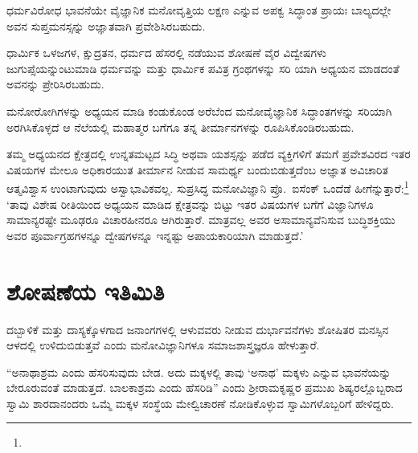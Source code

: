 \vskip 1.4pt

ಧರ್ಮವಿರೋಧ ಭಾವನೆಯೇ ವೈಜ್ಞಾನಿಕ ಮನೋವೃತ್ತಿಯ ಲಕ್ಷಣ ಎನ್ನುವ ಅಪಕ್ವ ಸಿದ್ಧಾಂತ ಪ್ರಾಯಃ ಬಾಲ್ಯದಲ್ಲೇ ಅವನ ಸುಪ್ತಮನಸ್ಸನ್ನು ಅಜ್ಞಾತವಾಗಿ ಪ್ರವೇಶಿಸಿರಬಹುದು.

\vskip 1.4pt

ಧಾರ್ಮಿಕ ಒಳಜಗಳ, ಕ್ಷುದ್ರತನ, ಧರ್ಮದ ಹೆಸರಲ್ಲಿ ನಡೆಯುವ ಶೋಷಣೆ ವೈರ ವಿದ್ವೇಷಗಳು ಜುಗುಪ್ಸೆಯನ್ನುಂಟುಮಾಡಿ ಧರ್ಮವನ್ನು ಮತ್ತು ಧಾರ್ಮಿಕ ಪವಿತ್ರ ಗ್ರಂಥಗಳನ್ನು ಸರಿ ಯಾಗಿ ಅಧ್ಯಯನ ಮಾಡದಂತೆ ಅವನನ್ನು ಪ್ರೇರಿಸಿರಬಹುದು.

\vskip 1.4pt

ಮನೋರೋಗಿಗಳನ್ನು ಅಧ್ಯಯನ ಮಾಡಿ ಕಂಡುಕೊಂಡ ಅರೆಬೆಂದ ಮನೋವೈಜ್ಞಾನಿಕ ಸಿದ್ಧಾಂತಗಳನ್ನು ಸರಿಯಾಗಿ ಅರಗಿಸಿಕೊಳ್ಳದೆ ಆ ನೆಲೆಯಲ್ಲಿ ಮಹಾತ್ಮರ ಬಗೆಗೂ ತನ್ನ ತೀರ್ಮಾನಗಳನ್ನು ರೂಪಿಸಿಕೊಂಡಿರಬಹುದು.

\vskip 1.4pt

ತಮ್ಮ ಅಧ್ಯಯನದ ಕ್ಷೇತ್ರದಲ್ಲಿ ಉನ್ನತಮಟ್ಟದ ಸಿದ್ಧಿ ಅಥವಾ ಯಶಸ್ಸನ್ನು ಪಡೆದ ವ್ಯಕ್ತಿಗಳಿಗೆ ತಮಗೆ ಪ್ರವೇಶವಿರದ ಇತರ ವಿಷಯಗಳ ಮೇಲೂ ಅಧಿಕಾರಯುತ ತೀರ್ಮಾನ ನೀಡುವ ಸಾಮರ್ಥ್ಯ ಬಂದುಬಿಡುತ್ತದೆಂಬ ಅಜ್ಞಾತ ಅವಿಚಾರಿತ ಆತ್ಮವಿಶ್ವಾಸ ಉಂಟಾಗುವುದು ಅಸ್ವಾಭಾವಿಕವಲ್ಲ. ಸುಪ್ರಸಿದ್ಧ ಮನೋವಿಜ್ಞಾನಿ ಪ್ರೊ.\ ಐಸೆಂಕ್ ಒಂದೆಡೆ ಹೀಗೆನ್ನುತ್ತಾರೆ:\footnote{\hfill{}} ‘ತಾವು ವಿಶೇಷ ರೀತಿಯಿಂದ ಅಧ್ಯಯನ ಮಾಡಿದ ಕ್ಷೇತ್ರವನ್ನು ಬಿಟ್ಟು ಇತರ ವಿಷಯಗಳ ಬಗೆಗೆ ವಿಜ್ಞಾನಿಗಳೂ ಸಾಮಾನ್ಯರಷ್ಟೇ ಮೂಢರೂ ವಿಚಾರಹೀನರೂ ಆಗಿರುತ್ತಾರೆ. ಮಾತ್ರವಲ್ಲ ಅವರ ಅಸಾಮಾನ್ಯ\-ವೆನಿಸುವ ಬುದ್ಧಿಶಕ್ತಿಯು ಅವರ ಪೂರ್ವಾಗ್ರಹಗಳನ್ನೂ ದ್ವೇಷಗಳನ್ನೂ ಇನ್ನಷ್ಟು ಅಪಾಯಕಾರಿಯಾಗಿ ಮಾಡುತ್ತದೆ.’


\section*{ಶೋಷಣೆಯ ಇತಿಮಿತಿ}


ದಬ್ಬಾಳಿಕೆ ಮತ್ತು ದಾಸ್ಯಕ್ಕೊಳಗಾದ ಜನಾಂಗಗಳಲ್ಲಿ ಆಳುವವರು ನೀಡುವ ದುರ್ಭಾವನೆಗಳು ಶೋಷಿತರ ಮನಸ್ಸಿನ ಆಳದಲ್ಲಿ ಉಳಿದುಬಿಡುತ್ತವೆ ಎಂದು ಮನೋವಿಜ್ಞಾನಿಗಳೂ ಸಮಾಜ\break ಶಾಸ್ತ್ರಜ್ಞರೂ ಹೇಳುತ್ತಾರೆ.

“ಅನಾಥಾಶ್ರಮ ಎಂದು ಹೆಸರಿಸುವುದು ಬೇಡ. ಅದು ಮಕ್ಕಳಲ್ಲಿ ತಾವು ‘ಅನಾಥ’ ಮಕ್ಕಳು ಎನ್ನುವ ಭಾವನೆಯನ್ನು ಬೇರೂರುವಂತೆ ಮಾಡುತ್ತದೆ. ಬಾಲಕಾಶ್ರಮ ಎಂದು ಹೆಸರಿಡಿ” ಎಂದು ಶ‍್ರೀರಾಮಕೃಷ್ಣರ ಪ್ರಮುಖ ಶಿಷ್ಯರಲ್ಲೊಬ್ಬರಾದ ಸ್ವಾಮಿ ಶಾರದಾನಂದರು ಒಮ್ಮೆ ಮಕ್ಕಳ ಸಂಸ್ಥೆಯ ಮೇಲ್ವಿಚಾರಣೆ ನೋಡಿಕೊಳ್ಳುವ ಸ್ವಾಮಿಗಳೊಬ್ಬರಿಗೆ ಹೇಳಿದ್ದರು.

